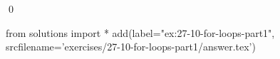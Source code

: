 
\begin{ex}
  \label{ex:27-10-for-loops-part1}
  
  \qed
\end{ex}
\begin{python0}
from solutions import *
add(label="ex:27-10-for-loops-part1",
    srcfilename='exercises/27-10-for-loops-part1/answer.tex')
\end{python0}
